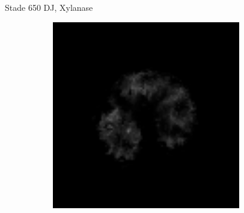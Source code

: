 \documentclass[10pt]{beamer}
\begin{document}
\begin{frame}{Stade 650 DJ, Xylanase}
\begin{figure}[ht]
\begin{subfigure}[t]{0.33\textwidth}
      
    \end{subfigure}%
    \begin{subfigure}[t]{0.33\textwidth}
      \centering
      \includegraphics[width=0.9\textwidth]{fig/stats_650Xyl_t2}

    \end{subfigure}%
    
  \end{figure}
\end{frame}
\end{document}
